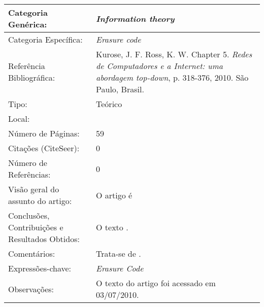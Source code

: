 \documentclass[10pt,a4paper]{article}
\begin{document}
\begin{center}
\begin{tabular}{|p{5cm}||p{10cm}|}
\hline

Categoria Genérica: & \emph{Information theory}\\\hline
Categoria Específica: & \emph{Erasure code}\\\hline
Referência Bibliográfica: & Kurose, J. F. Ross, K. W. Chapter 5. \emph{Redes de Computadores e a Internet: uma abordagem top-down}, p. 318-376, 2010. São Paulo, Brasil. \\\hline
Tipo: & Teórico\\\hline
Local: & \\\hline
Número de Páginas: & 59\\\hline
Citações (CiteSeer): & 0\\\hline
Número de Referências: & 0\\\hline
Visão geral do assunto do artigo: & O artigo é  \\\hline
Conclusões, Contribuições e Resultados Obtidos: &  O texto . \\\hline
Comentários: & Trata-se de . \\\hline
Expressões-chave: & \emph{Erasure Code}\\\hline
Observações: &  O texto do artigo foi acessado em 03/07/2010.\\\hline

\end{tabular}
\end{center}
\end{document}
